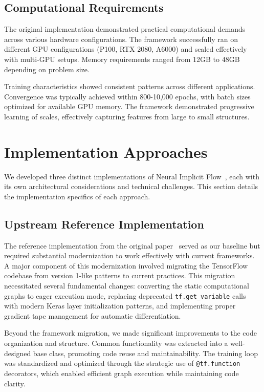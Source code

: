 \documentclass[10pt,journal,compsoc,onecolumn]{IEEEtran}
\begin{document}
\subsection{Computational Requirements}
The original implementation demonstrated practical computational demands across various hardware configurations. The framework successfully ran on different GPU configurations (P100, RTX 2080, A6000) and scaled effectively with multi-GPU setups. Memory requirements ranged from 12GB to 48GB depending on problem size.~\cite{nif2023}

Training characteristics showed consistent patterns across different applications. Convergence was typically achieved within 800-10,000 epochs, with batch sizes optimized for available GPU memory. The framework demonstrated progressive learning of scales, effectively capturing features from large to small structures.~\cite{nif2023}

\section{Implementation Approaches}\label{sec:implementation}
We developed three distinct implementations of Neural Implicit Flow~\cite{nif2023}, each with its own architectural considerations and technical challenges. This section details the implementation specifics of each approach.

\subsection{Upstream Reference Implementation}
The reference implementation from the original paper~\cite{nif2023github} served as our baseline but required substantial modernization to work effectively with current frameworks. A major component of this modernization involved migrating the TensorFlow codebase from version 1-like patterns to current practices. This migration necessitated several fundamental changes: converting the static computational graphs to eager execution mode, replacing deprecated \texttt{tf.get\_variable} calls with modern Keras layer initialization patterns, and implementing proper gradient tape management for automatic differentiation.

Beyond the framework migration, we made significant improvements to the code organization and structure. Common functionality was extracted into a well-designed base class, promoting code reuse and maintainability. The training loop was standardized and optimized through the strategic use of \texttt{@tf.function} decorators, which enabled efficient graph execution while maintaining code clarity.
\end{document}
